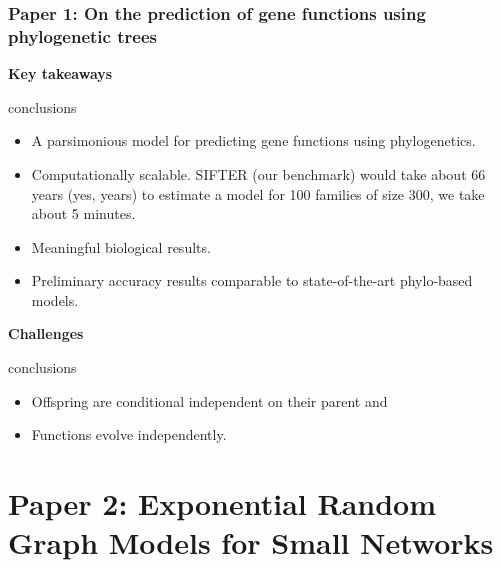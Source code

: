 \documentclass[aspectratio=169, 9pt]{beamer}\usepackage[]{graphicx}\usepackage[]{color}
\begin{document}
\begin{frame}[t]
\frametitle{Paper 1: On the prediction of gene functions using phylogenetic trees}

{\bf \large Key takeaways}
\begin{beamercolorbox}[dp=1ex]{conclusions}
\begin{itemize}
\item A parsimonious model for predicting gene functions using phylogenetics.
\item Computationally scalable. SIFTER (our benchmark)
would take about 66 years (yes, years) to estimate a model for 100 families
of size 300, we take about 5 minutes.
\item Meaningful biological results.
\item Preliminary accuracy results comparable to state-of-the-art phylo-based models.
\end{itemize}
\end{beamercolorbox}\pause

{\bf \large Challenges}
\begin{beamercolorbox}[dp=1ex]{conclusions}
\begin{itemize}
\item Offspring are conditional independent on their parent and\pause{}
\item Functions evolve independently. \hyperlink{duplicationvsspeciation}{}
\end{itemize}
\end{beamercolorbox}

\end{frame}



\section{Paper 2: Exponential Random Graph Models for Small Networks}

\end{document}
